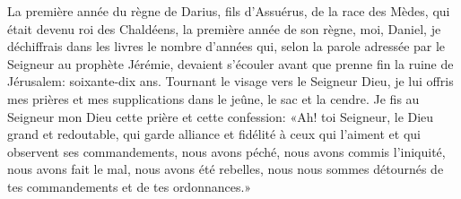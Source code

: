 La première année du règne de Darius, fils d’Assuérus, de la race des Mèdes,
	qui était devenu roi des Chaldéens,
	la première année de son règne, moi, Daniel,
	je déchiffrais dans les livres le nombre d’années qui,
		selon la parole adressée par le Seigneur au prophète Jérémie,
	devaient s’écouler avant que prenne fin la ruine de Jérusalem:
	soixante-dix ans.
Tournant le visage vers le Seigneur Dieu,
	je lui offris mes prières et mes supplications dans le jeûne, le sac et la cendre.
Je fis au Seigneur mon Dieu cette prière et cette confession:
	«Ah! toi Seigneur, le Dieu grand et redoutable,
	qui garde alliance et fidélité à ceux qui l’aiment et qui observent ses commandements,
	nous avons péché, nous avons commis l’iniquité,
	nous avons fait le mal, nous avons été rebelles,
	nous nous sommes détournés de tes commandements et de tes ordonnances.»
